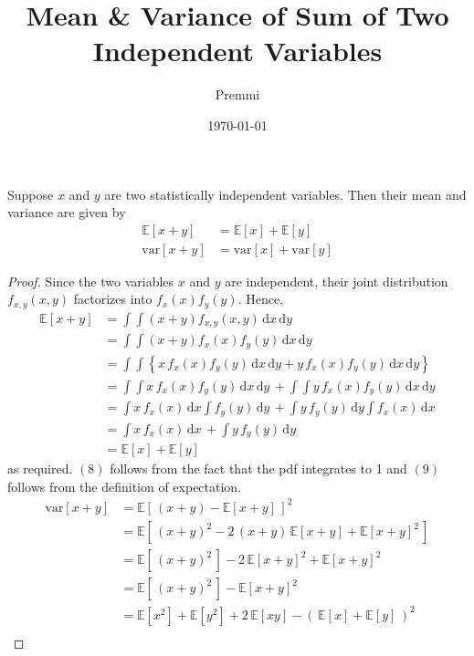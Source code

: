 \documentclass[14pt]{extarticle}
\title{Mean \& Variance of Sum of Two Independent Variables}
\author{Premmi}
\date{\today}
\begin{document}
    
\maketitle
\begin{flushleft}
\begin{large}
Suppose $x$ and $y$ are two statistically independent variables. Then their mean and variance are given by
\begin{align}
\mathbb{E}[x + y] &= \mathbb{E}[x] + \mathbb{E}[y]\\
\mathrm{var}[x + y] &= \mathrm{var}[x] + \mathrm{var}[y]
\end{align}
\begin{proof}
Since the two variables $x$ and $y$ are independent, their joint distribution $f_{x,y}(x,y)$ factorizes into $f_{x}(x)f_{y}(y)$. Hence,
\begin{align}
\mathbb{E}[x + y] &= \int\!\!\!\!\int (x + y) f_{x,y}(x, y)\, \mathrm{d}x \, \mathrm{d}y\\
&= \int\!\!\!\!\int (x + y) f_{x}(x) f_{y}(y) \,\mathrm{d}x \,\mathrm{d}y\\
&= \int\!\!\!\!\int \left\lbrace x\, f_{x}(x) f_{y}(y) \,\mathrm{d}x \,\mathrm{d}y + y\, f_{x}(x) f_{y}(y) \,\mathrm{d}x \,\mathrm{d}y \right\rbrace\\
&= \int\!\!\!\!\int  x\, f_{x}(x) f_{y}(y) \,\mathrm{d}x \,\mathrm{d}y \,+ \int\!\!\!\!\int  y\, f_{x}(x) f_{y}(y) \,\mathrm{d}x \,\mathrm{d}y\\
&= \int\! x\, f_{x}(x) \,\mathrm{d}x \int\! f_{y}(y)\,\mathrm{d}y\, + \int\! y\, f_{y}(y) \,\mathrm{d}y \int\! f_{x}(x)\,\mathrm{d}x\\
&= \int\! x\, f_{x}(x) \,\mathrm{d}x\, + \int\! y\, f_{y}(y) \,\mathrm{d}y\\
&= \mathbb{E}[x] + \mathbb{E}[y] 
\end{align}
as required. $(8)$ follows from the fact that the pdf integrates to 1 and $(9)$ follows from the definition of expectation.
\begin{align}
\mathrm{var}[x + y] &= \mathbb{E}[\,(x + y) - \mathbb{E}[x + y]\,]^2\\
&= \mathbb{E}[\,(x + y)^2 - 2\, (x + y)\,\mathbb{E}[x + y] + \mathbb{E}[x + y]^2\,]\\
&= \mathbb{E}[\,(x + y)^2\,] - 2\,\mathbb{E}[x + y]^2 + \mathbb{E}[x + y]^2\\
&= \mathbb{E}[\,(x + y)^2\,] - \mathbb{E}[x + y]^2\\
&= \mathbb{E}[x^2] + \mathbb{E}[y^2] + 2\,\mathbb{E}[xy] - (\,\mathbb{E}[x] + \mathbb{E}[y]\,)^2\\\

\end{align}
\end{proof}
\end{large}
\end{flushleft}
\end{document}
